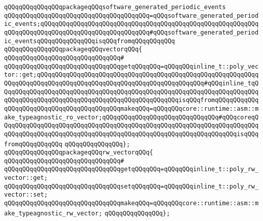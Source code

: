 \newline
\verb|qQQqqQQqqQQqqQQqpackageqQQqsoftware_generated_periodic_events|\newline
\verb|qQQqqQQqqQQqqQQqqQQqqQQqqQQqqQQqqQQqqQQq=qQQqsoftware_generated_periodic_events;qQQqqQQqqQQqqQQqqQQqqQQqqQQqqQQqqQQqqQQqqQQqqQQqqQQqqQQqqQQqqQQqqQQqqQQqqQQqqQQqqQQqqQQqqQQqqQQqqQQq#qQQqsoftware_generated_periodic_eventsqQQqqQQqqQQqqQQqisqQQqfromqQQqqQQqqQQq|\newline
\newline
\verb|qQQqqQQqqQQqqQQqpackageqQQqvectorqQQq{|\newline
\verb|qQQqqQQqqQQqqQQqqQQqqQQqqQQqqQQq#|\newline
\verb|qQQqqQQqqQQqqQQqqQQqqQQqqQQqqQQqgetqQQqqQQq=qQQqqQQqinline_t::poly_vector::get;qQQqqQQqqQQqqQQqqQQqqQQqqQQqqQQqqQQqqQQqqQQqqQQqqQQqqQQqqQQqqQQqqQQqqQQqqQQqqQQqqQQqqQQqqQQqqQQqqQQqqQQqqQQqqQQqqQQq#qQQqinline_tqQQqqQQqqQQqqQQqqQQqqQQqqQQqqQQqqQQqqQQqqQQqqQQqqQQqqQQqqQQqqQQqqQQqqQQqqQQqqQQqqQQqqQQqqQQqqQQqqQQqqQQqqQQqqQQqqQQqqQQqisqQQqfromqQQqqQQqqQQq|\newline
\verb|qQQqqQQqqQQqqQQqqQQqqQQqqQQqqQQqmakeqQQq=qQQqqQQqcore::runtime::asm::make_typeagnostic_ro_vector;qQQqqQQqqQQqqQQqqQQqqQQqqQQqqQQq#qQQqcoreqQQqqQQqqQQqqQQqqQQqqQQqqQQqqQQqqQQqqQQqqQQqqQQqqQQqqQQqqQQqqQQqqQQqqQQqqQQqqQQqqQQqqQQqqQQqqQQqqQQqqQQqqQQqqQQqqQQqqQQqqQQqqQQqqQQqqQQqisqQQqfromqQQqqQQqqQQq|\newline
\verb|qQQqqQQqqQQqqQQq};|\newline
\newline
\verb|qQQqqQQqqQQqqQQqpackageqQQqrw_vectorqQQq{|\newline
\verb|qQQqqQQqqQQqqQQqqQQqqQQqqQQqqQQq#|\newline
\verb|qQQqqQQqqQQqqQQqqQQqqQQqqQQqqQQqgetqQQqqQQq=qQQqqQQqinline_t::poly_rw_vector::get;|\newline
\verb|qQQqqQQqqQQqqQQqqQQqqQQqqQQqqQQqsetqQQqqQQq=qQQqqQQqinline_t::poly_rw_vector::set;|\newline
\verb|qQQqqQQqqQQqqQQqqQQqqQQqqQQqqQQqmakeqQQq=qQQqqQQqcore::runtime::asm::make_typeagnostic_rw_vector;|\newline
\verb|qQQqqQQqqQQqqQQq};|\newline
\newline
